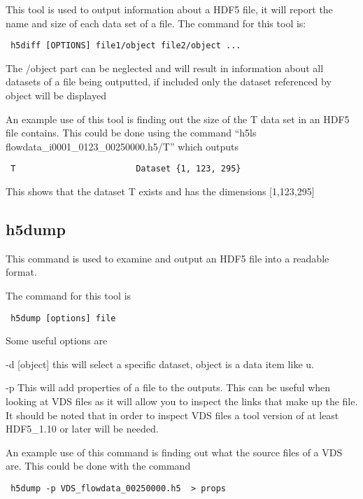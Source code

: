 \documentclass[12pt, oneside]{article}
\begin{document}
This tool is used to output information about a HDF5 file, it will report the name and size of each data set of a file.
The command for this tool is:

\begin{verbatim}
 h5diff [OPTIONS] file1/object file2/object ... 
\end{verbatim}

\noindent The /object part can be neglected and will result in information about all datasets of a file being outputted, if included only the dataset referenced by object will be displayed

\newline
An example use of this tool is finding out the size of the T data set in an HDF5 file contains. This could be done using the command ``h5ls flowdata\_i0001\_0123\_00250000.h5/T'' which outputs

\begin{verbatim}
 T                        Dataset {1, 123, 295}
\end{verbatim}
\newline
This shows that the dataset T exists and has the dimensions [1,123,295]



\subsection{h5dump}

This command is used to examine and output an HDF5 file into a readable format.

\noindent The command for this tool is

\begin{verbatim}
 h5dump [options] file
\end{verbatim}

\noindent Some useful options are

 -d [object]   this will select a specific dataset, object is a data item like u.

 -p  This will add properties of a file to the outputs. This can be useful when looking at VDS files as it will allow you to inspect the links that make up the file.
It should be noted that in order to inspect VDS files a tool version of at least HDF5\_1.10 or later will be needed.

\newline
An example use of this command is finding out what the source files of a VDS are. This could be done with the command 
\begin{verbatim}
 h5dump -p VDS_flowdata_00250000.h5  > props
\end{verbatim}
\end{document}
